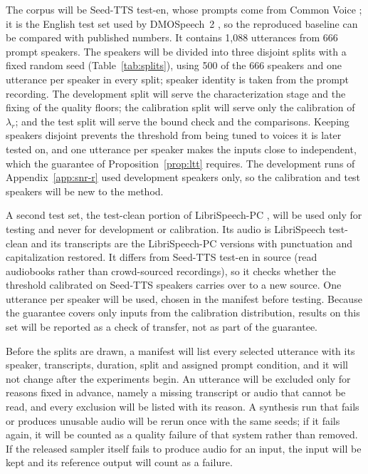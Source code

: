 The corpus will be Seed-TTS test-en, whose prompts come from Common Voice \parencite{anastassiou2024seedtts,ardila2020commonvoice}; it is the English test set used by DMOSpeech~2 \parencite{li2025dmospeech2}, so the reproduced baseline can be compared with published numbers. It contains 1,088 utterances from 666 prompt speakers. The speakers will be divided into three disjoint splits with a fixed random seed (Table~\ref{tab:splits}), using 500 of the 666 speakers and one utterance per speaker in every split; speaker identity is taken from the prompt recording. The development split will serve the characterization stage and the fixing of the quality floors; the calibration split will serve only the calibration of $\lambda_r$; and the test split will serve the bound check and the comparisons. Keeping speakers disjoint prevents the threshold from being tuned to voices it is later tested on, and one utterance per speaker makes the inputs close to independent, which the guarantee of Proposition~\ref{prop:ltt} requires. The development runs of Appendix~\ref{app:snr-r} used development speakers only, so the calibration and test speakers will be new to the method.

A second test set, the test-clean portion of LibriSpeech-PC \parencite{meister2023librispeechpc}, will be used only for testing and never for development or calibration. Its audio is LibriSpeech test-clean \parencite{panayotov2015librispeech} and its transcripts are the LibriSpeech-PC versions with punctuation and capitalization restored. It differs from Seed-TTS test-en in source (read audiobooks rather than crowd-sourced recordings), so it checks whether the threshold calibrated on Seed-TTS speakers carries over to a new source. One utterance per speaker will be used, chosen in the manifest before testing. Because the guarantee covers only inputs from the calibration distribution, results on this set will be reported as a check of transfer, not as part of the guarantee.

Before the splits are drawn, a manifest will list every selected utterance with its speaker, transcripts, duration, split and assigned prompt condition, and it will not change after the experiments begin. An utterance will be excluded only for reasons fixed in advance, namely a missing transcript or audio that cannot be read, and every exclusion will be listed with its reason. A synthesis run that fails or produces unusable audio will be rerun once with the same seeds; if it fails again, it will be counted as a quality failure of that system rather than removed. If the released sampler itself fails to produce audio for an input, the input will be kept and its reference output will count as a failure.

